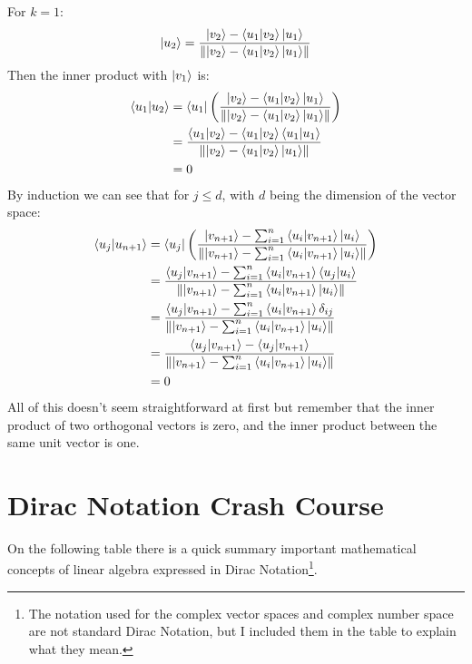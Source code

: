 For $k=1$:
$$
\ket{u_2} = \frac{\ket{v_2} - \bra{u_1}\ket{v_2}\ket{u_1}}{\norm{\ket{v_2} - \bra{u_1}\ket{v_2}\ket{u_1}}}
$$
Then the inner product with $\ket{v_1}$ is:
$$
\begin{aligned}
\bra{u_1}\ket{u_2} 
&= \bra{u_1} \left( \frac{\ket{v_2} - \bra{u_1}\ket{v_2}\ket{u_1}}{\norm{\ket{v_2} - \bra{u_1}\ket{v_2}\ket{u_1}}} \right) \\
&= \frac{\bra{u_1}\ket{v_2} - \bra{u_1}\ket{v_2}\bra{u_1}\ket{u_1}}{\norm{\ket{v_2} - \bra{u_1}\ket{v_2}\ket{u_1}}} \\
&= 0
\end{aligned}
$$
By induction we can see that for $j \leq d$, with $d$ being the dimension of the vector space:
$$
\begin{aligned}
	\bra{u_j}\ket{u_{n+1}} 
	& = \bra{u_j} \left( \frac{\ket{v_{n+1}} - \sum_{i=1}^{n} \bra{u_i}\ket{v_{n+1}}\ket{u_i}}{\norm{\ket{v_{n+1}} - \sum_{i=1}^{n} \bra{u_i}\ket{v_{n+1}}\ket{u_i}}} \right) \\
	& = \frac{\bra{u_j}\ket{v_{n+1}} - \sum_{i=1}^{n} \bra{u_i}\ket{v_{n+1}} \bra{u_j}\ket{u_i}}{\norm{\ket{v_{n+1}} - \sum_{i=1}^{n} \bra{u_i}\ket{v_{n+1}} \ket{u_i}}} \\
	& = \frac{\bra{u_j}\ket{v_{n+1}} - \sum_{i=1}^{n} \bra{u_i}\ket{v_{n+1}} \delta_{ij}}{\norm{\ket{v_{n+1}} - \sum_{i=1}^{n} \bra{u_i}\ket{v_{n+1}} \ket{u_i}}} \\
	& = \frac{\bra{u_j}\ket{v_{n+1}} - \bra{u_j}\ket{v_{n+1}}}{\norm{\ket{v_{n+1}} - \sum_{i=1}^{n} \bra{u_i}\ket{v_{n+1}} \ket{u_i}}} \\
	& = 0	\\
\end{aligned}
$$
All of this doesn't seem straightforward at first but remember that the inner product of two orthogonal vectors is zero, and the inner product between the same unit vector is one. 

\section{Dirac Notation Crash Course}

On the following table there is a quick summary important mathematical concepts of linear algebra \cite{QCandQI:dirac_notation} expressed in Dirac Notation\footnote{The notation used for the complex vector spaces and complex number space are not standard Dirac Notation, but I included them in the table to explain what they mean.}. 

